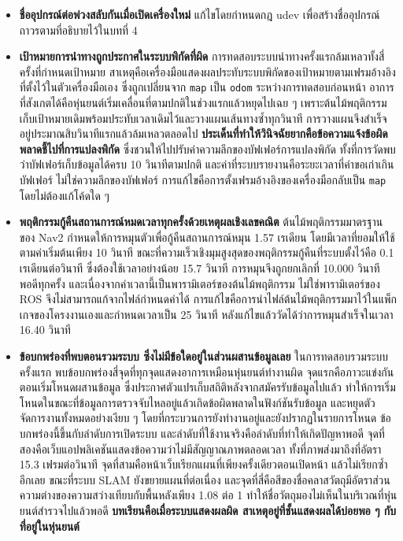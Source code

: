 \documentclass[a4paper,12pt]{report}
\begin{document}
\begin{itemize}[leftmargin=1.25cm, itemsep=6pt, topsep=6pt]
    \item \textbf{ชื่ออุปกรณ์ต่อพ่วงสลับกันเมื่อเปิดเครื่องใหม่}
    แก้ไขโดยกำหนดกฎ udev เพื่อสร้างชื่ออุปกรณ์ถาวรตามที่อธิบายไว้ในบทที่ 4

    \item \textbf{เป้าหมายการนำทางถูกประกาศในระบบพิกัดที่ผิด}
    การทดสอบระบบนำทางครั้งแรกล้มเหลวทั้งสี่ครั้งที่กำหนดเป้าหมาย
    สาเหตุคือเครื่องมือแสดงผลประทับระบบพิกัดของเป้าหมายตามเฟรมอ้างอิงที่ตั้งไว้ในตัวเครื่องมือเอง
    ซึ่งถูกเปลี่ยนจาก \texttt{map} เป็น \texttt{odom} ระหว่างการทดสอบก่อนหน้า
    อาการที่สังเกตได้คือหุ่นยนต์เริ่มเคลื่อนที่ตามปกติในช่วงแรกแล้วหยุดไปเฉย ๆ
    เพราะต้นไม้พฤติกรรมเก็บเป้าหมายเดิมพร้อมประทับเวลาเดิมไว้และวางแผนเส้นทางซ้ำทุกวินาที
    การวางแผนจึงสำเร็จอยู่ประมาณสิบวินาทีแรกแล้วล้มเหลวตลอดไป
    \textbf{ประเด็นที่ทำให้วินิจฉัยยากคือข้อความแจ้งข้อผิดพลาดชี้ไปที่การแปลงพิกัด}
    ซึ่งชวนให้ไปปรับค่าความลึกของบัฟเฟอร์การแปลงพิกัด
    ทั้งที่การวัดพบว่าบัฟเฟอร์เก็บข้อมูลได้ครบ 10 วินาทีตามปกติ
    และค่าที่ระบบรายงานคือระยะเวลาที่คำขอเก่าเกินบัฟเฟอร์ ไม่ใช่ความลึกของบัฟเฟอร์
    การแก้ไขคือการตั้งเฟรมอ้างอิงของเครื่องมือกลับเป็น \texttt{map} โดยไม่ต้องแก้โค้ดใด ๆ

    \item \textbf{พฤติกรรมกู้คืนสถานการณ์หมดเวลาทุกครั้งด้วยเหตุผลเชิงเลขคณิต}
    ต้นไม้พฤติกรรมมาตรฐานของ Nav2 กำหนดให้การหมุนตัวเพื่อกู้คืนสถานการณ์หมุน 1.57 เรเดียน
    โดยมีเวลาที่ยอมให้ใช้ตามค่าเริ่มต้นเพียง 10 วินาที
    ขณะที่ความเร็วเชิงมุมสูงสุดของพฤติกรรมกู้คืนที่ระบบตั้งไว้คือ 0.1 เรเดียนต่อวินาที
    ซึ่งต้องใช้เวลาอย่างน้อย 15.7 วินาที การหมุนจึงถูกยกเลิกที่ 10.000 วินาทีพอดีทุกครั้ง
    และเนื่องจากค่าเวลานี้เป็นพารามิเตอร์ของต้นไม้พฤติกรรม ไม่ใช่พารามิเตอร์ของ ROS
    จึงไม่สามารถแก้จากไฟล์กำหนดค่าได้
    การแก้ไขคือการนำไฟล์ต้นไม้พฤติกรรมมาไว้ในแพ็กเกจของโครงงานเองและกำหนดเวลาเป็น 25 วินาที
    หลังแก้ไขแล้ววัดได้ว่าการหมุนสำเร็จในเวลา 16.40 วินาที

    \item \textbf{ข้อบกพร่องที่พบตอนรวมระบบ ซึ่งไม่มีข้อใดอยู่ในส่วนผสานข้อมูลเลย}
    ในการทดสอบรวมระบบครั้งแรก พบข้อบกพร่องสี่จุดที่ทุกจุดแสดงอาการเหมือนหุ่นยนต์ทำงานผิด
    จุดแรกคือภาวะแข่งกันตอนเริ่มโหนดผสานข้อมูล
    ซึ่งประกาศตัวแปรเก็บสถิติหลังจากสมัครรับข้อมูลไปแล้ว
    ทำให้การเริ่มโหนดในขณะที่ข้อมูลการตรวจจับไหลอยู่แล้วเกิดข้อผิดพลาดในฟังก์ชันรับข้อมูล
    และหยุดตัวจัดการงานทั้งหมดอย่างเงียบ ๆ โดยที่กระบวนการยังทำงานอยู่และยังปรากฏในรายการโหนด
    ข้อบกพร่องนี้ขึ้นกับลำดับการเปิดระบบ และลำดับที่ใช้งานจริงคือลำดับที่ทำให้เกิดปัญหาพอดี
    จุดที่สองคือเว็บแอปพลิเคชันแสดงข้อความว่าไม่มีสัญญาณภาพตลอดเวลา
    ทั้งที่ภาพส่งมาถึงที่อัตรา 15.3 เฟรมต่อวินาที
    จุดที่สามคือหน้าเว็บเรียกแผนที่เพียงครั้งเดียวตอนเปิดหน้า แล้วไม่เรียกซ้ำอีกเลย
    ขณะที่ระบบ SLAM ยังขยายแผนที่ต่อเนื่อง
    และจุดที่สี่คือสีของชื่อคลาสวัตถุมีอัตราส่วนความต่างของความสว่างเทียบกับพื้นหลังเพียง 1.08 ต่อ 1
    ทำให้ชื่อวัตถุมองไม่เห็นในบริเวณที่หุ่นยนต์สำรวจไปแล้วพอดี
    \textbf{บทเรียนคือเมื่อระบบแสดงผลผิด สาเหตุอยู่ที่ชั้นแสดงผลได้บ่อยพอ ๆ กับที่อยู่ในหุ่นยนต์}
\end{itemize}
\end{document}
